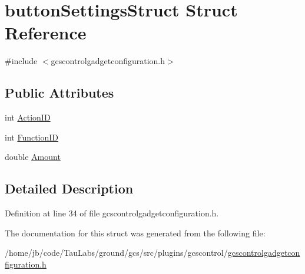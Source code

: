 \hypertarget{structbutton_settings_struct}{\section{button\-Settings\-Struct \-Struct \-Reference}
\label{structbutton_settings_struct}
}


{\ttfamily \#include $<$gcscontrolgadgetconfiguration.\-h$>$}

\subsection*{\-Public \-Attributes}
\begin{DoxyCompactItemize}
\item 
int \hyperlink{group___g_c_s_control_gadget_plugin_ga03093dd46af520daf9f990be1e2fe9c6}{\-Action\-I\-D}
\item 
int \hyperlink{group___g_c_s_control_gadget_plugin_ga0cf7694f3cc910d158e54851d077dd22}{\-Function\-I\-D}
\item 
double \hyperlink{group___g_c_s_control_gadget_plugin_gaaa14aa6512e6e46a95fcfd01c675cbf7}{\-Amount}
\end{DoxyCompactItemize}


\subsection{\-Detailed \-Description}


\-Definition at line 34 of file gcscontrolgadgetconfiguration.\-h.



\-The documentation for this struct was generated from the following file\-:\begin{DoxyCompactItemize}
\item 
/home/jb/code/\-Tau\-Labs/ground/gcs/src/plugins/gcscontrol/\hyperlink{gcscontrolgadgetconfiguration_8h}{gcscontrolgadgetconfiguration.\-h}\end{DoxyCompactItemize}
